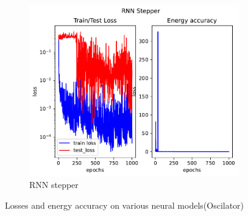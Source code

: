 \begin{figure}[H]
\begin{subfigure}[b]{0.3\textwidth}
		\includegraphics[width=\textwidth]{chapters/chapter5/body2_rne_loss.pdf}
		\caption{RNN stepper}
	\end{subfigure}
	
	\caption{Losses and energy accuracy on various neural models(Oscilator)}
\end{figure}

